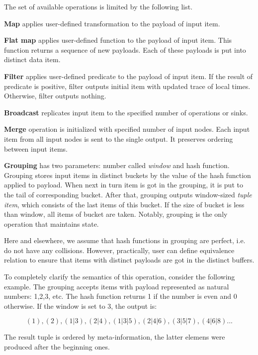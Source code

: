 
\label {fs-ops}

The set of available operations is limited by the following list.

{\bf Map} applies user-defined transformation to the payload of input item. 

{\bf Flat map} applies user-defined function to the payload of input item. This function returns a sequence of new payloads. Each of these payloads is put into distinct data item. 

{\bf Filter} applies user-defined predicate to the payload of input item. If the result of predicate is positive, filter outputs initial item with updated trace of local times. Otherwise, filter outputs nothing.

{\bf Broadcast} replicates input item to the specified number of operations or sinks. 

{\bf Merge} operation is initialized with specified number of input nodes. Each input item from all input nodes is sent to the single output. It preserves ordering between input items.

{\bf Grouping} has two parameters: number called {\it window} and hash function. Grouping stores input items in distinct buckets by the value of the hash function applied to payload. When next in turn item is got in the grouping, it is put to the tail of corresponding bucket. After that, grouping outputs window-sized {\it tuple item}, which consists of the last items of this bucket. If the size of bucket is less than window, all items of bucket are taken. Notably, grouping is the only operation that maintains state.
	
Here and elsewhere, we assume that hash functions in grouping are perfect, i.e. do not have any collisions. However, practically, user can define equivalence relation to ensure that items with distinct payloads are got in the distinct buffers.
	
To completely clarify the semantics of this operation, consider the following example. The grouping accepts items with payload represented as natural numbers: 1,2,3, etc. The hash function returns 1 if the number is even and 0 otherwise. If the window is set to 3, the output is:

\[(1), (2), (1|3), (2|4), (1|3|5), (2|4|6), (3|5|7), (4|6|8)...\]

The result tuple is ordered by meta-information, the latter elemens were produced after the beginning ones. 

